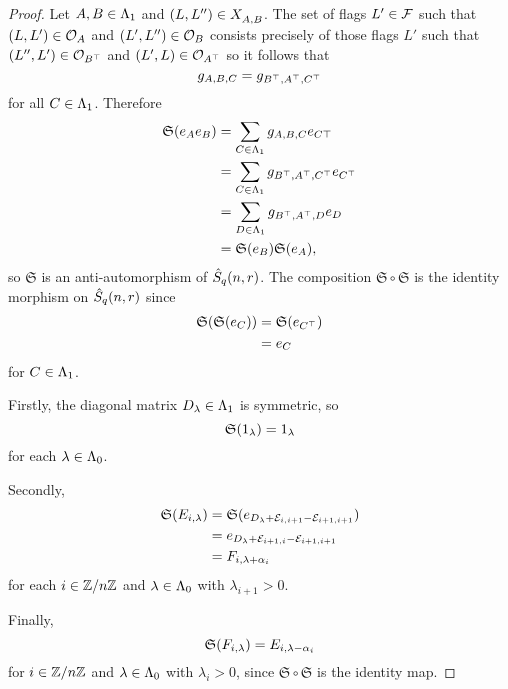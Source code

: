 \documentclass[a4paper, 11pt, twoside]{report}
\begin{document}
\begin{proof}
Let $A,B\in\Lambda_1{}$ and $(L,L'')\in X_{A,B}^{}$. The set of flags $L'\in\mathcal{F}$ such that $(L,L')\in\mathcal{O}_{A}$ and $(L',L'')\in\mathcal{O}_{B}$ consists precisely of those flags $L'$ such that $(L'',L')\in\mathcal{O}_{B^\top}$ and $(L',L)\in\mathcal{O}_{A^\top}$ so it follows that
\begin{equation*}
g_{A,B,C} = g_{B^\top, A^\top, C^\top}
\end{equation*}
for all $C\in\Lambda_1{}$. Therefore
\begin{align*}
\mathfrak{S}{(e_A e_B)}
&= \sum_{C\in\Lambda_1{}} g_{A,B,C}e_{C\top}\\
&= \sum_{C\in\Lambda_1{}} g_{B^\top,A^\top,C^\top}e_{C^\top}\\
&= \sum_{D\in\Lambda_1{}} g_{B^\top,A^\top,D}e_D\\
&= \mathfrak{S}{(e_B)}\mathfrak{S}{(e_A)},
\end{align*}
so $\mathfrak{S}$ is an anti-automorphism of $\hat{S}_q(n,r)$. The composition $\mathfrak{S}\circ \mathfrak{S}$ is the identity morphism on $\hat{S}_q(n,r)$ since
\begin{align*}
\mathfrak{S}{(\mathfrak{S}{(e_C)})}
&= \mathfrak{S}{(e_{C^\top})}\\
&= e_C
\end{align*}
for $C\in\Lambda_1{}$.

Firstly, the diagonal matrix $D_\lambda\in\Lambda_1{}$ is symmetric, so
\begin{equation*}
\mathfrak{S}{(1_\lambda)} = 1_\lambda
\end{equation*}
for each $\lambda\in\Lambda_0{}$.

Secondly,
\begin{align*}
\mathfrak{S}{(E_{i,\lambda})}
&= \mathfrak{S}{(e_{D_\lambda+\mathcal{E}_{i,i+1}-\mathcal{E}_{i+1,i+1}})}\\
&= e_{D_\lambda+\mathcal{E}_{i+1,i}-\mathcal{E}_{i+1,i+1}}\\
&= F_{i,\lambda+\alpha_i}
\end{align*}
for each $i\in\mathbb{Z}/{n \mathbb{Z}}$ and $\lambda\in\Lambda_0{}$ with $\lambda_{i+1}>0$.

Finally,
\begin{equation*}
\mathfrak{S}{(F_{i,\lambda})} = E_{i,\lambda -\alpha_i}
\end{equation*}
for $i\in\mathbb{Z}/{n \mathbb{Z}}$ and $\lambda\in\Lambda_0{}$ with $\lambda_i>0$, since $\mathfrak{S}\circ \mathfrak{S}$ is the identity map.
\end{proof}
\end{document}

